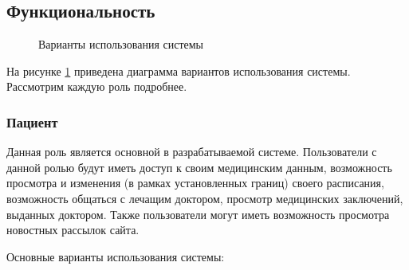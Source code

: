 \newpage
\subsection{Функциональность}
\begin{figure}[h]
\caption{Варианты использования системы}
\label{ris:main_use_case}
\end{figure}

На рисунке \ref{ris:main_use_case} приведена диаграмма вариантов использования
системы. Рассмотрим каждую роль подробнее.

\subsubsection{Пациент}
Данная роль является основной в разрабатываемой системе. Пользователи с данной
ролью будут иметь доступ к своим медицинским данным, возможность просмотра и
изменения (в рамках установленных границ) своего расписания, возможность
общаться с лечащим доктором, просмотр медицинских заключений, выданных доктором.
Также пользователи могут иметь возможность просмотра новостных рассылок сайта.

Основные варианты использования системы:

